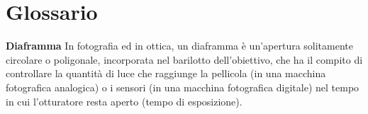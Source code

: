 

\chapter{Glossario} %
\renewcommand{\chaptername}{MyChapter}
\label{AppendixA} %


\textbf{Diaframma} In fotografia ed in ottica, un diaframma è un'apertura solitamente circolare o poligonale, incorporata nel barilotto dell'obiettivo, che ha il compito di controllare la quantità di luce che raggiunge la pellicola (in una macchina fotografica analogica) o i sensori (in una macchina fotografica digitale) nel tempo in cui l'otturatore resta aperto (tempo di esposizione).